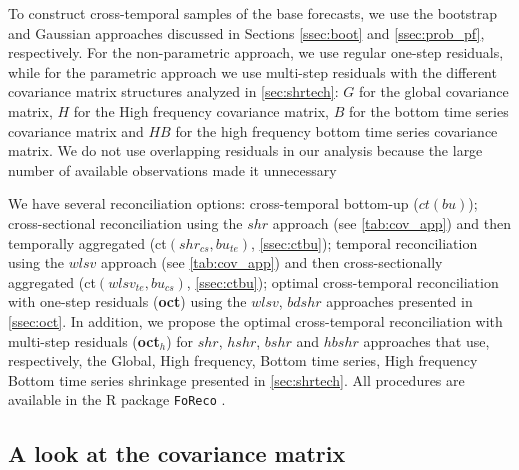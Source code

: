 \documentclass[a4paper,11pt]{article}
\theoremstyle{definition}
\begin{document}
To construct cross-temporal samples of the base forecasts, we use the bootstrap and Gaussian approaches discussed in Sections \ref{ssec:boot} and \ref{ssec:prob_pf}, respectively. For the non-parametric approach, we use regular one-step residuals, while for the parametric approach we use multi-step residuals with the different covariance matrix structures analyzed in \autoref{sec:shrtech}: $G$ for the global covariance matrix, $H$ for the High frequency covariance matrix, $B$ for the bottom time series covariance matrix and $HB$ for the high frequency bottom time series covariance matrix. We do not use overlapping residuals in our analysis because the large number of available observations made it unnecessary %

We have several reconciliation options: cross-temporal bottom-up ($ct(bu)$); cross-sectional reconciliation using the $shr$ approach (see \autoref{tab:cov_app}) and then temporally aggregated (ct$(shr_{cs}, bu_{te})$, \autoref{ssec:ctbu});  temporal reconciliation using the $wlsv$ approach (see \autoref{tab:cov_app}) and then cross-sectionally aggregated (ct$(wlsv_{te}, bu_{cs})$, \autoref{ssec:ctbu}); optimal cross-temporal reconciliation \citep{difonzo2023} with one-step residuals (\textbf{oct}) using the $wlsv$, $bdshr$ approaches presented in \autoref{ssec:oct}.
In addition, we propose the optimal cross-temporal reconciliation with multi-step residuals (\textbf{oct$_h$}) for $shr$, $hshr$, $bshr$ and $hbshr$ approaches that use, respectively, the Global, High frequency, Bottom time series, High frequency Bottom time series shrinkage presented in \autoref{sec:shrtech}. All procedures are available in the R package \texttt{FoReco} \citep{foreco2023}.

\subsection{A look at the covariance matrix}
\end{document}
